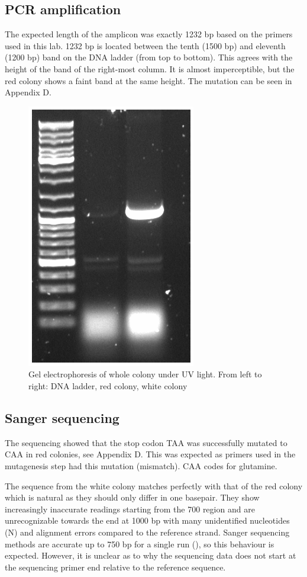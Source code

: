 \documentclass[11pt,a4paper]{article}
\begin{document}
\subsection{PCR amplification}
The expected length of the amplicon was exactly 1232 bp based on the primers used in this lab. 1232 bp is located between the tenth (1500 bp) and eleventh (1200 bp) band on the DNA ladder (from top to bottom). This agrees with the height of the band of the right-most column. It is almost imperceptible, but the red colony shows a faint band at the same height. The mutation can be seen in Appendix D. 
\begin{figure}[H]
    \centering
    \includegraphics[scale=0.3]{Dellabb 6 DNA.png}
    \caption{Gel electrophoresis of whole colony under UV light. From left to right: DNA ladder, red colony, white colony}
    \label{colony pcr}
\end{figure}

\subsection{Sanger sequencing}
The sequencing showed that the stop codon TAA was successfully mutated to CAA in red colonies, see Appendix D. This was expected as primers used in the mutagenesis step had this mutation (mismatch). CAA codes for glutamine. 

The sequence from the white colony matches perfectly with that of the red colony which is natural as they should only differ in one basepair. They show increasingly inaccurate readings starting from the 700 region and are unrecognizable towards the end at 1000 bp with many unidentified nucleotides (N) and alignment errors compared to the reference strand. Sanger sequencing methods are accurate up to 750 bp for a single run (\cite{brown}), so this behaviour is expected. However, it is unclear as to why the sequencing data does not start at the sequencing primer end relative to the reference sequence.
\end{document}
